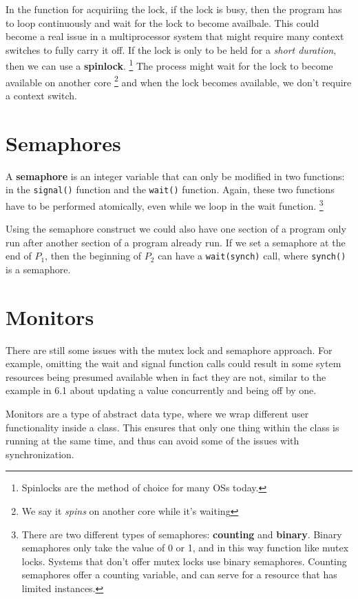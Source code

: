 \documentclass{tufte-handout}
\begin{document}
In the function for acquiriing the lock, if the lock is busy, then the program has to 
loop continuously and wait for the lock to become availbale. This could become a real issue
in a multiprocessor system that might require many context switches to fully carry it off.
If the lock is only to be held for a \textit{short duration}, then we can use a 
\textbf{spinlock}.
\footnote{Spinlocks are the method of choice for many OSs today.}
The process might wait for the lock to become available on another core
\footnote{We say it \textit{spins} on another core while it's waiting}
and when the lock becomes available, we don't require a context switch.

\section{Semaphores}
A \textbf{semaphore} is an integer variable that can only be modified in two functions: 
in the \texttt{signal()} function and the \texttt{wait()} function. Again, these two 
functions have to be performed atomically, even while we loop in the wait function.
\footnote{There are two different types of semaphores: \textbf{counting} and \textbf{binary}.
Binary semaphores only take the value of 0 or 1, and in this way function like mutex locks.
Systems that don't offer mutex locks use binary semaphores. Counting semaphores offer a 
counting variable, and can serve for a resource that has limited instances.}

Using the semaphore construct we could also have one section of a program only run after
another section of a program already run. If we set a semaphore at the end of $P_{1}$, then
the beginning of $P_{2}$ can have a \texttt{wait(synch)} call, where \texttt{synch()} is a
semaphore.

\section{Monitors}
There are still some issues with the mutex lock and semaphore approach. For example, omitting 
the wait and signal function calls could result in some sytem resources being presumed 
available when in fact they are not, similar to the example in 6.1 about updating a value 
concurrently and being off by one.

Monitors are a type of abstract data type, where we wrap different user functionality inside
a class. This ensures that only one thing within the class is running at the same time, and 
thus can avoid some of the issues with synchronization.
\end{document}
